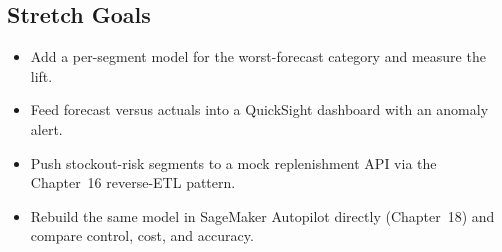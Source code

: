 \subsection*{Stretch Goals}
\begin{itemize}
    \item Add a per-segment model for the worst-forecast category and measure the lift.
    \item Feed forecast versus actuals into a QuickSight dashboard with an anomaly alert.
    \item Push stockout-risk segments to a mock replenishment API via the Chapter~16 reverse-ETL pattern.
    \item Rebuild the same model in SageMaker Autopilot directly (Chapter~18) and compare control, cost, and accuracy.
\end{itemize}
